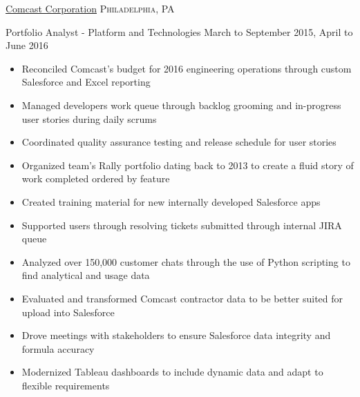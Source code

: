 \documentclass[10pt,letterpaper]{article}
\begin{document}
\headedsection
  {\href{http://corporate.comcast.com/}{Comcast Corporation}}
  {\textsc{Philadelphia, PA}} {%
  \headedsubsection
    {Portfolio Analyst - Platform and Technologies}
    {March to September 2015, April to June 2016}
    {\begin{itemize}
    \item Reconciled Comcast's budget for 2016 engineering operations through custom Salesforce and Excel reporting
    \item Managed developers work queue through backlog grooming and in-progress user stories during daily scrums
    \item Coordinated quality assurance testing and release schedule for user stories
    \item Organized team's Rally portfolio dating back to 2013 to create a fluid story of work completed ordered by feature
    \item Created training material for new internally developed Salesforce apps
    \item Supported users through resolving tickets submitted through internal JIRA queue
    \item Analyzed over 150,000 customer chats through the use of Python scripting to find analytical and usage data
    \item Evaluated and transformed Comcast contractor data to be better suited for upload into Salesforce
    \item Drove meetings with stakeholders to ensure Salesforce data integrity and formula accuracy
    \item Modernized Tableau dashboards to include dynamic data and adapt to flexible requirements
    \end{itemize}}
}
\end{document}
